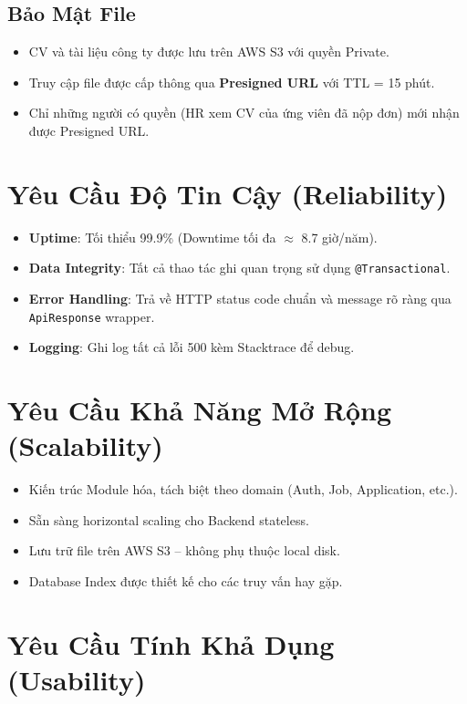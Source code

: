 \documentclass[12pt, a4paper]{report}
\begin{document}
\subsection{Bảo Mật File}

\begin{itemize}
    \item CV và tài liệu công ty được lưu trên AWS S3 với quyền Private.
    \item Truy cập file được cấp thông qua \textbf{Presigned URL} với TTL = 15 phút.
    \item Chỉ những người có quyền (HR xem CV của ứng viên đã nộp đơn) mới nhận được Presigned URL.
\end{itemize}

\section{Yêu Cầu Độ Tin Cậy (Reliability)}

\begin{itemize}
    \item \textbf{Uptime}: Tối thiểu 99.9\% (Downtime tối đa $\approx$ 8.7 giờ/năm).
    \item \textbf{Data Integrity}: Tất cả thao tác ghi quan trọng sử dụng \texttt{@Transactional}.
    \item \textbf{Error Handling}: Trả về HTTP status code chuẩn và message rõ ràng qua \texttt{ApiResponse} wrapper.
    \item \textbf{Logging}: Ghi log tất cả lỗi 500 kèm Stacktrace để debug.
\end{itemize}

\section{Yêu Cầu Khả Năng Mở Rộng (Scalability)}

\begin{itemize}
    \item Kiến trúc Module hóa, tách biệt theo domain (Auth, Job, Application, etc.).
    \item Sẵn sàng horizontal scaling cho Backend stateless.
    \item Lưu trữ file trên AWS S3 -- không phụ thuộc local disk.
    \item Database Index được thiết kế cho các truy vấn hay gặp.
\end{itemize}

\section{Yêu Cầu Tính Khả Dụng (Usability)}
\end{document}
